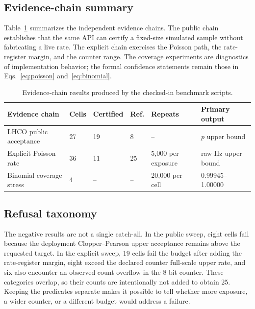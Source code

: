 \documentclass[submission, Phys]{SciPost}
\begin{document}
\subsection{Evidence-chain summary}

Table~\ref{tab:results} summarizes the independent evidence chains.  The
public chain establishes that the same API can certify a fixed-size simulated
sample without fabricating a live rate.  The explicit chain exercises the
Poisson path, the rate-register margin, and the counter range.  The coverage
experiments are diagnostics of implementation behavior; the formal confidence
statements remain those in Eqs.~\eqref{eq:poisson} and~\eqref{eq:binomial}.

\begin{table}[t]
\centering\small
\caption{Evidence-chain results produced by the checked-in benchmark scripts.}
\label{tab:results}
\begin{tabular}{p{}p{}p{}p{}p{}p{}}
\toprule
Evidence chain & Cells & Certified & Ref. & Repeats & Primary output \\
\midrule
LHCO public acceptance & 27 & 19 & 8 & -- & $p$ upper bound \\
Explicit Poisson rate & 36 & 11 & 25 & 5,000 per exposure & raw Hz upper bound \\
Binomial coverage stress & 4 & -- & -- & 20,000 per cell & 0.99945--1.00000 \\
\bottomrule
\end{tabular}
\end{table}

\subsection{Refusal taxonomy}

The negative results are not a single catch-all.  In the public sweep, eight
cells fail because the deployment Clopper--Pearson upper acceptance remains
above the requested target.  In the explicit sweep, 19 cells fail the budget
after adding the rate-register margin, eight exceed the declared counter
full-scale upper rate, and six also encounter an observed-count overflow in the
8-bit counter.  These categories overlap, so their counts are intentionally not
added to obtain 25.  Keeping the predicates separate makes it possible to tell
whether more exposure, a wider counter, or a different budget would address a
failure.
\end{document}
